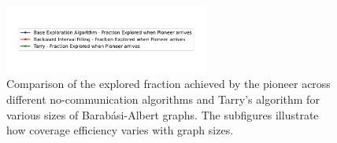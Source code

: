 \begin{figure}[H]
    \centering
    \qquad
    \qquad
    \includegraphics[width=0.6\textwidth]{Cap3/no_comm_fraction_legend.pdf}
    \newline
    \qquad
    \newline
    \qquad
    \caption{Comparison of the explored fraction achieved by the pioneer across different no-communication algorithms and Tarry's algorithm for various sizes of Barabási-Albert graphs. The subfigures illustrate how coverage efficiency varies with graph sizes.}
    \label{fig_no_comm_fraction_all_sizes_barabasi}
\end{figure}

